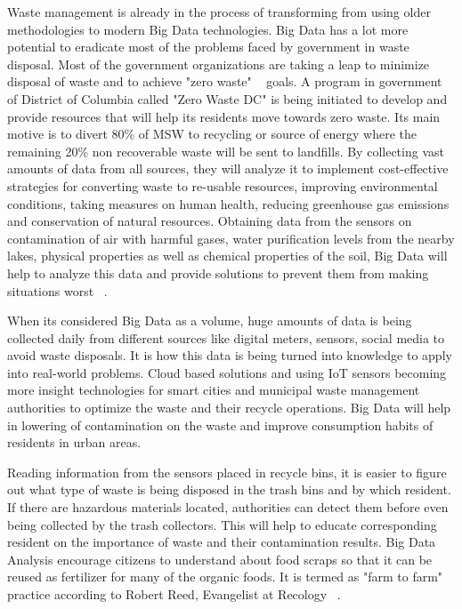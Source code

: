 \documentclass[sigconf]{acmart}
\begin{document}
Waste management is already in the process of transforming from using older methodologies to modern Big Data technologies. Big Data has a lot more potential to eradicate most of the problems faced by government in waste disposal. Most of the government organizations are taking a leap to minimize disposal of waste and to achieve "zero waste" ~\cite{rosengren2017} goals. A program in government of District of Columbia called "Zero Waste DC" is being initiated to develop and provide resources that will help its residents move towards zero waste. Its main motive is to divert 80\% of MSW to recycling or source of energy where the remaining 20\% non recoverable waste will be sent to landfills. By collecting vast amounts of data from all sources, they will analyze it to implement cost-effective strategies for converting waste to re-usable resources, improving environmental conditions, taking measures on human health, reducing greenhouse gas emissions and conservation of natural resources. Obtaining data from the sensors on contamination of air with harmful gases, water purification levels from the nearby lakes, physical properties as well as chemical properties of the soil, Big Data will help to analyze this data and provide solutions to prevent them from making situations worst ~\cite{rosengren2017}.

When its considered Big Data as a volume, huge amounts of data is being collected daily from different sources like digital meters, sensors, social media to avoid waste disposals. It is how this data is being turned into knowledge to apply into real-world problems. Cloud based solutions and using IoT sensors becoming more insight technologies for smart cities and municipal waste management authorities to optimize the waste and their recycle operations. Big Data will help in lowering of contamination on the waste and improve consumption habits of residents in urban areas.

Reading information from the sensors placed in recycle bins, it is easier to figure out what type of waste is being disposed in the trash bins and by which resident. If there are hazardous materials located, authorities can detect them before even being collected by the trash collectors. This will help to educate corresponding resident on the importance of waste and their contamination results. Big Data Analysis encourage citizens to understand about food scraps so that it can be reused as fertilizer for many of the organic foods. It is termed as "farm to farm" practice according to Robert Reed, Evangelist at Recology ~\cite{james2012}.
\end{document}
